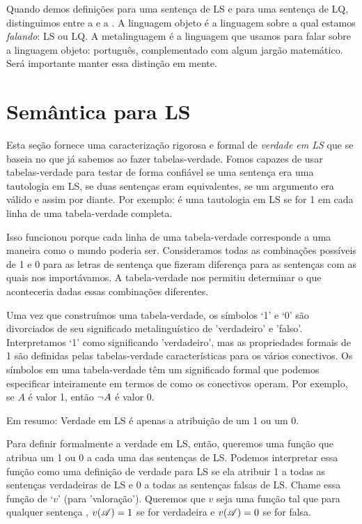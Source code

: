 Quando demos definições para uma sentença de LS e para uma sentença de LQ, distinguimos entre a  e a . A linguagem objeto é a linguagem sobre a qual estamos \emph{falando}: LS ou LQ. A metalinguagem é a linguagem que usamos para falar sobre a linguagem objeto: português, complementado com algum jargão matemático. Será importante manter essa distinção em mente.

\section{Semântica para LS}

Esta seção fornece uma caracterização rigorosa e formal de \emph{verdade em LS} que se baseia no que já sabemos ao fazer tabelas-verdade. Fomos capazes de usar tabelas-verdade para testar de forma confiável se uma sentença era uma tautologia em LS, se duas sentenças eram equivalentes, se um argumento era válido e assim por diante. Por exemplo:  é uma tautologia em LS se for 1 em cada linha de uma tabela-verdade completa.

Isso funcionou porque cada linha de uma tabela-verdade corresponde a uma maneira como o mundo poderia ser. Consideramos todas as combinações possíveis de 1 e 0 para as letras de sentença que fizeram diferença para as sentenças com as quais nos importávamos. A tabela-verdade nos permitiu determinar o que aconteceria dadas essas combinações diferentes.

Uma vez que construímos uma tabela-verdade, os símbolos `1' e `0' são divorciados de seu significado metalinguístico de 'verdadeiro' e 'falso'. Interpretamos `1' como significando 'verdadeiro', mas as propriedades formais de 1 são definidas pelas tabelas-verdade características para os vários conectivos. Os símbolos em uma tabela-verdade têm um significado formal que podemos especificar inteiramente em termos de como os conectivos operam. Por exemplo, se $A$ é valor 1, então $\neg A$ é valor 0.

Em resumo: Verdade em LS é apenas a atribuição de um 1 ou um 0.

Para definir formalmente a verdade em LS, então, queremos uma função que atribua um 1 ou 0 a cada uma das sentenças de LS. Podemos interpretar essa função como uma definição de verdade para LS se ela atribuir 1 a todas as sentenças verdadeiras de LS e 0 a todas as sentenças falsas de LS. Chame essa função de `$v$' (para 'valoração'). Queremos que $v$ seja uma função tal que para qualquer sentença , $v(\mathscr{A})=1$ se  for verdadeira e $v(\mathscr{A})=0$ se  for falsa.


